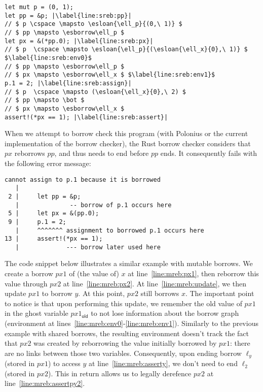 \documentclass[acmsmall,screen]{acmart}
\newcommand\esborrow[1]{\ensuremath{\mathsf{borrow}^s\,#1}}
\newcommand\esloan[2]{\ensuremath{\mathsf{loan}^s\,\{#1\}\,#2}}
\newlength{\characterlength}
\newcommand\cspace{\hspace{\characterlength}}
\begin{document}
\begin{verbatim}
let mut p = (0, 1);
let pp = &p; |\label{line:sreb:pp}|
// $ p \cspace \mapsto \esloan{\ell_p}{(0,\ 1)} $
// $ pp \mapsto \esborrow\ell_p $
let px = &(*pp.0); |\label{line:sreb:px}|
// $ p  \cspace \mapsto \esloan{\ell_p}{(\esloan{\ell_x}{0},\ 1)} $ $\label{line:sreb:env0}$
// $ pp \mapsto \esborrow\ell_p $
// $ px \mapsto \esborrow\ell_x $ $\label{line:sreb:env1}$
p.1 = 2; |\label{line:sreb:assign}|
// $ p  \cspace \mapsto (\esloan{\ell_x}{0},\ 2) $
// $ pp \mapsto \bot $
// $ px \mapsto \esborrow\ell_x $
assert!(*px == 1); |\label{line:sreb:assert}|
\end{verbatim}

\noindent
When we attempt to borrow check this program (with Polonius or the current implementation
of the borrow checker), the Rust borrow checker considers that $px$ reborrows $pp$, and
thus needs to end before $pp$ ends. It consequently fails with the following error message:

\begin{verbatim}
cannot assign to p.1 because it is borrowed
   |
 2 |     let pp = &p;
   |              -- borrow of p.1 occurs here
 5 |     let px = &(pp.0);
 9 |     p.1 = 2;
   |     ^^^^^^^ assignment to borrowed p.1 occurs here
13 |     assert!(*px == 1);
   |             --- borrow later used here
\end{verbatim}

The code snippet below illustrates a similar example with mutable borrows.
We create a borrow $px1$ of (the value of) $x$ at line~\ref{line:mreb:px1}, then reborrow
this value through $px2$ at line~\ref{line:mreb:px2}. At line~\ref{line:mreb:update},
we then update $px1$ to borrow $y$. At this point, $px2$ still borrows $x$.
The important point to notice is that upon performing this update, we remember
the old value of $px1$ in the ghost variable $px1_{\mathsf{old}}$ to not lose information
about the borrow graph (environment at lines~\ref{line:mreb:env0}-\ref{line:mreb:env1}).
Similarly to the previous example with shared borrows,
the resulting environment doesn't track
the fact that $px2$ was created by reborrowing the value initially borrowed by $px1$:
there are no links between those two variables.
Consequently, upon ending borrow $\ell_y$ (stored in $px1$) to access
$y$ at line~\ref{line:mreb:asserty}, we don't need to end $\ell_2$ (stored in $px2$).
This in return allows us to legally derefence $px2$ at line~\ref{line:mreb:assertpy2}.
\end{document}
